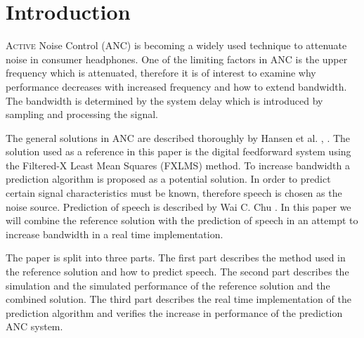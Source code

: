 \section{Introduction}
\lettrine[lines=2]{A}{ctive} Noise Control (ANC) is becoming a widely used technique to attenuate noise in consumer headphones. One of the limiting factors in ANC is the upper frequency which is attenuated, therefore it is of interest to examine why performance decreases with increased frequency and how to extend bandwidth. The bandwidth is determined by the system delay which is introduced by sampling and processing the signal.   

The general solutions in ANC are described thoroughly by Hansen et al. \cite{Hansen2}, \cite{Hansen}. The solution used as a reference in this paper is the digital feedforward system using the Filtered-X Least Mean Squares (FXLMS) method. To increase bandwidth a prediction algorithm is proposed as a potential solution. In order to predict certain signal characteristics must be known, therefore speech is chosen as the noise source. Prediction of speech is described by Wai C. Chu \cite{Speech}. In this paper we will combine the reference solution with the prediction of speech in an attempt to increase bandwidth in a real time implementation.  

The paper is split into three parts. The first part describes the method used in the reference solution and how to predict speech. The second part describes the simulation and the simulated performance of the reference solution and the combined solution. The third part describes the real time implementation of the prediction algorithm and verifies the increase in performance of the prediction ANC system.  
        








